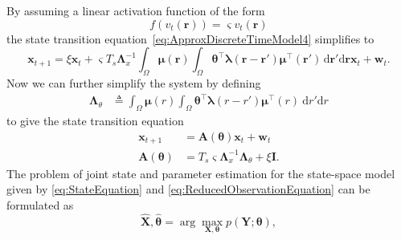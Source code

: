 \documentclass[review,authoryear,3p]{elsarticle}
\begin{document}
By assuming a linear activation function of the form
\begin{equation}
	f(v_t(\mathbf{r})) = \varsigma v_t(\mathbf{r})
\end{equation}
the state transition equation~\eqref{eq:ApproxDiscreteTimeModel4} simplifies to
\begin{equation}\label{eq:ApproxDiscreteTimeModel_Linear}
	\mathbf{x}_{t+1} = 
	\xi \mathbf{x}_t + 
	\varsigma T_s \mathbf{\Lambda}_{x}^{-1} \int_{\Omega}\boldsymbol\mu\left(\mathbf{r}\right)\int_\Omega { 
	    \boldsymbol\theta^\top\boldsymbol\lambda\left(\mathbf{r}-\mathbf{r}'\right)
	    \boldsymbol\mu^\top\left(\mathbf{r}'\right) 
	\, \mathrm{d}\mathbf{r}'\mathrm{d}\mathbf{r}} \mathbf{x}_t
	+ \mathbf{w}_t.
\end{equation}
Now we can further simplify the system by defining
\begin{align}
	\label{eq:Lambdatheta}
	 \mathbf{\Lambda}_{\theta} &\triangleq \int_{\Omega}\boldsymbol\mu\left(r\right) \int_\Omega { 
		   \boldsymbol\theta^\top\boldsymbol\lambda\left(r-r'\right)
		    \boldsymbol\mu^\top\left(r\right)\ \mathrm{d}r'\mathrm{d}r}
\end{align}
to give the state transition equation
\begin{align}\label{eq:StateEquation}
 \mathbf x_{t+1} &=\mathbf A(\boldsymbol \theta) \mathbf x_t+ \mathbf w_t\\
\label{eq:A_theta}
 \mathbf A(\boldsymbol \theta) &= T_s\varsigma\mathbf{\Lambda}_{x}^{-1}\mathbf{\Lambda}_{\theta}+\xi\mathbf I.
\end{align} 
The problem of joint state and parameter estimation for the state-space model given by \eqref{eq:StateEquation} and \eqref{eq:ReducedObservationEquation} can be formulated as 
\begin{equation}
	{\hat{\mathbf X},\hat{\boldsymbol\theta}}=\arg\max_{\mathbf X,\boldsymbol\theta}p(\mathbf Y;\boldsymbol\theta),
 \end{equation}  
\end{document}
